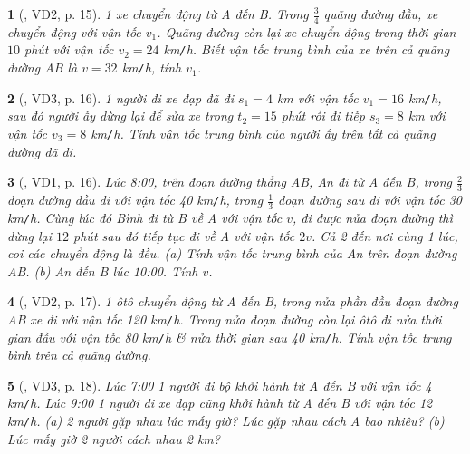 \documentclass{article}
\newtheorem{baitoan}{}
\begin{document}
\begin{baitoan}[\cite{Van_Quyen_Hanh_Nhu_10_chuyen_Ly}, VD2, p. 15]
	1 xe chuyển động từ A đến B. Trong $\frac{3}{4}$ quãng đường đầu, xe chuyển động với vận tốc $v_1$. Quãng đường còn lại xe chuyển động trong thời gian $10$ phút với vận tốc $v_2 = 24$ {\rm km{\tt/}h}. Biết vận tốc trung bình của xe trên cả quãng đường AB là $v = 32$ {\rm km{\tt/}h}, tính $v_1$.
\end{baitoan}

\begin{baitoan}[\cite{Van_Quyen_Hanh_Nhu_10_chuyen_Ly}, VD3, p. 16]
	1 người đi xe đạp đã đi $s_1 = 4$ {\rm km} với vận tốc $v_1 = 16$ {\rm km{\tt/}h}, sau đó người ấy dừng lại để sửa xe trong $t_2 = 15$ phút rồi đi tiếp $s_3 = 8$ {\rm km} với vận tốc $v_3 = 8$ {\rm km{\tt/}h}. Tính vận tốc trung bình của người ấy trên tất cả quãng đường đã đi.
\end{baitoan}

\begin{baitoan}[\cite{Van_Quyen_Hanh_Nhu_10_chuyen_Ly}, VD1, p. 16]
	Lúc {\rm8:00}, trên đoạn đường thẳng AB, An đi từ A đến B, trong $\frac{2}{3}$ đoạn đường đầu đi với vận tốc {\rm40 km{\tt/}h}, trong $\frac{1}{3}$ đoạn đường sau đi với vận tốc {\rm30 km{\tt/}h}. Cùng lúc đó Bình đi từ B về A với vận tốc $v$, đi được nửa đoạn đường thì dừng lại $12$ phút sau đó tiếp tục đi về A với vận tốc $2v$. Cả 2 đến nơi cùng 1 lúc, coi các chuyển động là đều. (a) Tính vận tốc trung bình của An trên đoạn đường AB. (b) An đến B lúc {\rm10:00}. Tính $v$.
\end{baitoan}

\begin{baitoan}[\cite{Van_Quyen_Hanh_Nhu_10_chuyen_Ly}, VD2, p. 17]
	1 ôtô chuyển động từ A đến B, trong nửa phần đầu đoạn đường AB xe đi với vận tốc {\rm120 km{\tt/}h}. Trong nửa đoạn đường còn lại ôtô đi nửa thời gian đầu với vận tốc {\rm80 km{\tt/}h} \& nửa thời gian sau {\rm40 km{\tt/}h}. Tính vận tốc trung bình trên cả quãng đường.
\end{baitoan}

\begin{baitoan}[\cite{Van_Quyen_Hanh_Nhu_10_chuyen_Ly}, VD3, p. 18]
	Lúc {\rm7:00} 1 người đi bộ khởi hành từ A đến B với vận tốc {\rm4 km{\tt/}h}. Lúc {\rm9:00} 1 người đi xe đạp cũng khởi hành từ A đến B với vận tốc {\rm12 km{\tt/}h}. (a) 2 người gặp nhau lúc mấy giờ? Lúc gặp nhau cách A bao nhiêu? (b) Lúc mấy giờ 2 người cách nhau {\rm2 km}?
\end{baitoan}
\end{document}
